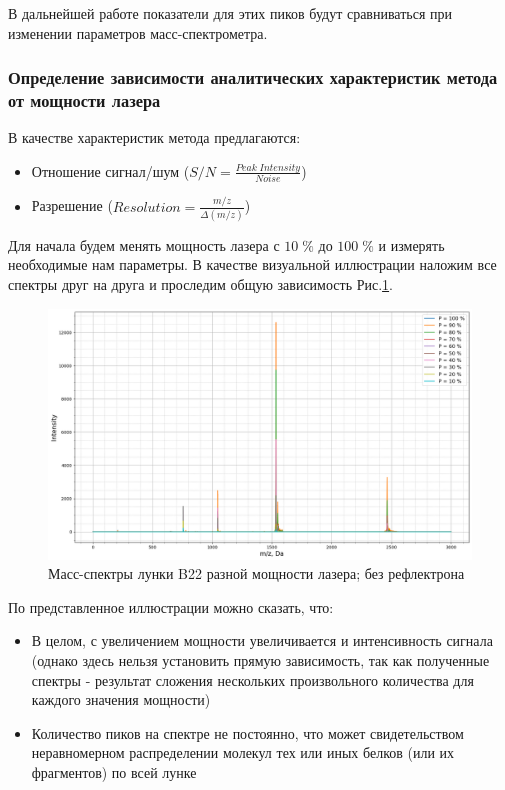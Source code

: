 \documentclass{article}
\begin{document}
В дальнейшей работе показатели для этих пиков будут сравниваться при изменении параметров масс-спектрометра. 

\subsubsection{Определение зависимости аналитических характеристик метода от мощности лазера}\;
\par В качестве характеристик метода предлагаются:
\begin{itemize}
    \item Отношение сигнал/шум ($S/N = \frac{Peak \; Intensity}{Noise}$)
    \item Разрешение ($Resolution = \frac{m/z}{\Delta(m/z)}$)
\end{itemize}

Для начала будем менять мощность лазера с $10 \; \%$ до $100 \; \%$ и измерять необходимые нам параметры. В качестве визуальной иллюстрации наложим все спектры друг на друга и проследим общую зависимость Рис.\ref{Мощность}.
\begin{figure}[h!]
\centering
    \includegraphics[width=1\linewidth]{Images/linear_power.png}
    \caption{Масс-спектры лунки B22 разной мощности лазера; без рефлектрона}
    \label{Мощность}
\end{figure}

По представленное иллюстрации можно сказать, что:
\begin{itemize}
    \item В целом, с увеличением мощности увеличивается и интенсивность сигнала (однако здесь нельзя установить прямую зависимость, так как полученные спектры - результат сложения нескольких произвольного количества для каждого значения мощности)
    \item Количество пиков на спектре не постоянно, что может свидетельством неравномерном распределении молекул тех или иных белков (или их фрагментов) по всей лунке
\end{itemize}
\end{document}
